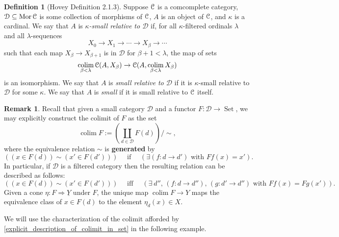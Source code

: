 \documentclass{amsart}
\theoremstyle{plain}
\theoremstyle{definition}
\newtheorem{remark}[theorem]{Remark}
\newtheorem{definition}[theorem]{Definition}
\newcommand{\sseq}{\subseteq}
\newcommand{\0}{\mathbf{0}}
\newcommand{\cC}{\mathcal C}
\newcommand{\cD}{\mathcal D}
\renewcommand{\(}{\left(}
\renewcommand{\)}{\right)}
\def\on{\operatorname}
\def\scr{\EuScript}
\def\Set{\on{Set}}
\def\cC{\scr{C}}
\DeclareMathOperator*{\colim}{colim}
\DeclareMathOperator{\Mor}{Mor}
\begin{document}
\begin{definition}[Hovey Definition 2.1.3]
  Suppose $\cC$ is a comcomplete category, $\cD\sseq\Mor\cC$ is some collection of morphisms of $\cC$, $A$ is an object of $\cC$, and $\kappa$ is a cardinal. We say that $A$ is \textit{$\kappa$-small relative to $\cD$} if, for all $\kappa$-filtered ordinals $\lambda$ and all $\lambda$-sequences
  \[X_0\to X_1\to\cdots\to X_\beta\to\cdots\]
  such that each map $X_\beta\to X_{\beta+1}$ is in $\cD$ for $\beta+1<\lambda$, the map of sets
  \[\colim_{\beta<\lambda}\cC(A,X_\beta)\to\cC(A,\colim_{\beta<\lambda}X_\beta)\]
  is an isomorphism. We say that $A$ is \textit{small relative to $\cD$} if it is $\kappa$-small relative to $\cD$ for some $\kappa$. We say that $A$ is \textit{small} if it is small relative to $\cC$ itself.
\end{definition}

\begin{remark}\label{explicit_description_of_colimit_in_set}
Recall that given a small category $\cD$ and a functor $F:\cD\to\Set$, we may explicitly construct the colimit of $F$ as the set
\[\colim F:=\(\coprod_{d\in \cD}F(d)\)/\sim,\]
where the equivalence relation $\sim$ is \textbf{generated} by
\[((x\in F(d))\sim(x'\in F(d')))\quad\text{ if }\quad(\exists(f:d\to d')\text{ with }Ff(x)=x').\]
In particular, if $\cD$ is a filtered category then the resulting relation can be described as follows:
\begin{equation*}
  ((x\in F(d))\sim(x'\in F(d')))\quad\text{ iff }\quad(\exists\ d'',\,(f:d\to d''),\,(g:d'\to d'')\text{ with }Ff(x)=Fg(x')).
\end{equation*}
Given a cone $\eta:F\Rightarrow\underline Y$ under $F$, the unique map $\colim F\to Y$ maps the equivalence class of $x\in F(d)$ to the element $\eta_d(x)\in X$. 
\end{remark}

We will use the characterization of the colimit afforded by \autoref{explicit_description_of_colimit_in_set} in the following example.
\end{document}
